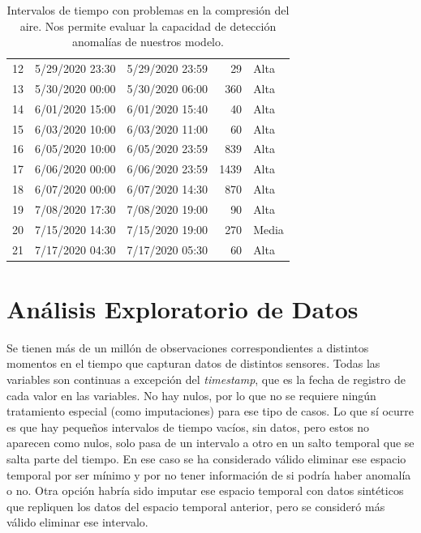 \documentclass[12pt,letterpaper]{article}
\begin{document}
\begin{table}[htp]
\begin{tabular}{cllrl}
12           & 5/29/2020 23:30          & 5/29/2020 23:59           & 29                 & Alta              \\
13           & 5/30/2020 00:00          & 5/30/2020 06:00           & 360                & Alta              \\
14           & 6/01/2020 15:00          & 6/01/2020 15:40           & 40                 & Alta              \\
15           & 6/03/2020 10:00          & 6/03/2020 11:00           & 60                 & Alta              \\
16           & 6/05/2020 10:00          & 6/05/2020 23:59           & 839                & Alta              \\
17           & 6/06/2020 00:00          & 6/06/2020 23:59           & 1439               & Alta              \\
18           & 6/07/2020 00:00          & 6/07/2020 14:30           & 870                & Alta              \\
19           & 7/08/2020 17:30          & 7/08/2020 19:00           & 90                 & Alta              \\
20           & 7/15/2020 14:30          & 7/15/2020 19:00           & 270                & Media            \\ 
21           & 7/17/2020 04:30          & 7/17/2020 05:30           & 60                 & Alta              \\ \hline
\end{tabular}
    \caption{
    Intervalos de tiempo con problemas en la compresión del aire.
    Nos permite evaluar la capacidad de detección anomalías de nuestros modelo.}
    \label{tab:Reportes}
\end{table}

\section{Análisis Exploratorio de Datos}
Se tienen más de un millón de observaciones correspondientes a distintos momentos en el tiempo que capturan datos de distintos sensores. Todas las variables son continuas a excepción del \textit{timestamp}, que es la fecha de registro de cada valor en las variables.
No hay nulos, por lo que no se requiere ningún tratamiento especial (como imputaciones) para ese tipo de casos. Lo que sí ocurre es que hay pequeños intervalos de tiempo vacíos, sin datos, pero estos no aparecen como nulos, solo pasa de un intervalo a otro en un salto temporal que se salta parte del tiempo. En ese caso se ha considerado válido eliminar ese espacio temporal por ser mínimo y por no tener información de si podría haber anomalía o no. Otra opción habría sido imputar ese espacio temporal con datos sintéticos que repliquen los datos del espacio temporal anterior, pero se consideró más válido eliminar ese intervalo.
\end{document}
